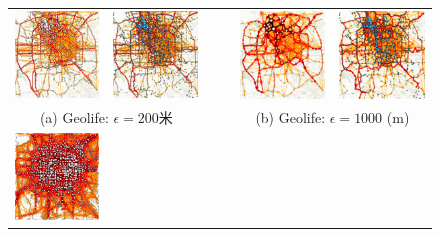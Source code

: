 \tabcolsep=0pt
\begin{figure}[!htb]
\centering
\begin{tabular}{ccccc}
\includegraphics[width=35mm]{pics/Geolife200without.eps}&
\includegraphics[width=35mm]{pics/Geolife200with.eps}&
~~&
\includegraphics[width=35mm]{pics/Geolife1000without.eps}&
\includegraphics[width=35mm]{pics/Geolife1000with.eps}\\
\multicolumn{2}{c}{(a) Geolife: $\epsilon = 200$米} & & \multicolumn{2}{c}{(b) Geolife: $\epsilon = 1000$ (m)}\\
\includegraphics[width=35mm]{pics/tdrive200without.eps}&

\end{tabular}
\end{figure}
